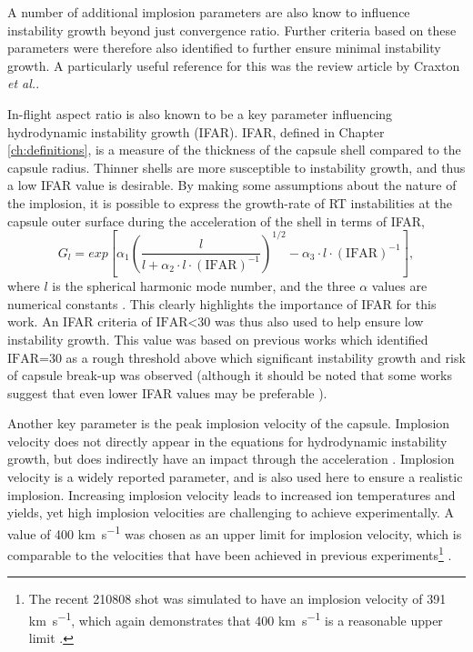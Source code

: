 A number of additional implosion parameters are also know to influence instability growth beyond just convergence ratio. Further criteria based on these parameters were therefore also identified to further ensure minimal instability growth. A particularly useful reference for this was the review article by Craxton \textit{et al.}\cite{Craxton2015}.

In-flight aspect ratio is also known to be a key parameter influencing hydrodynamic instability growth (IFAR). IFAR, defined in Chapter \ref{ch:definitions}, is a measure of the thickness of the capsule shell compared to the capsule radius. Thinner shells are more susceptible to instability growth, and thus a low IFAR value is desirable. By making some assumptions about the nature of the implosion, it is possible to express the growth-rate of RT instabilities at the capsule outer surface during the acceleration of the shell in terms of IFAR, 
\begin{equation} G_l = exp \left[ \alpha_1 \left( \frac{l}{l + \alpha_2 \cdot l \cdot (\mathrm{IFAR})^{-1}} \right)^{1/2} - \alpha_3 \cdot l \cdot (\mathrm{IFAR})^{-1} \right], \label{eq: IFARGrowth} \end{equation} where $l$ is the spherical harmonic mode number, and the three $\alpha$ values are numerical constants \cite{Atzeni2008}. This clearly highlights the importance of IFAR for this work. An IFAR criteria of $\textrm{IFAR<30}$ was thus also used to help ensure low instability growth. This value was based on previous works which identified $\textrm{IFAR=30}$ as a rough threshold above which significant instability growth and risk of capsule break-up was observed \cite{Lindl1995} (although it should be noted that some works suggest that even lower IFAR values may be preferable \cite{Radha2011, Goncharov2003}).

Another key parameter is the peak implosion velocity of the capsule. Implosion velocity does not directly appear in the equations for hydrodynamic instability growth, but does indirectly have an impact through the acceleration \cite{Atzeni2008}. Implosion velocity is a widely reported parameter, and is also used here to ensure a realistic implosion. Increasing implosion velocity leads to increased ion temperatures and yields, yet high implosion velocities are challenging to achieve experimentally. A value of 400 \unit{\kilo\meter\per\second} was chosen as an upper limit for implosion velocity, which is comparable to the velocities that have been achieved in previous experiments\footnote{The recent 210808 shot was simulated to have an implosion velocity of 391 \unit{\kilo\meter\per\second}, which again demonstrates that 400 \unit{\kilo\meter\per\second} is a reasonable upper limit \cite{Kritcher2022}.} \cite{Craxton2015, Callahan2015}.

